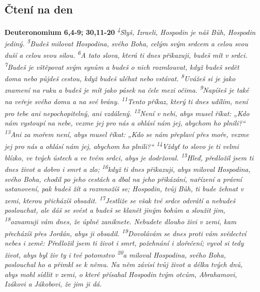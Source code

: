 \documentclass[11pt]{article}
\begin{document}
\subsection*{Čtení na den}
\textbf{Deuteronomium 6,4-9; 30,11-20}
\newline
\textit{
\textsuperscript{4}Slyš, Izraeli, Hospodin je náš Bůh, Hospodin jediný.
\textsuperscript{5}Budeš milovat Hospodina, svého Boha, celým svým srdcem a celou svou duší a celou svou silou.
\textsuperscript{6}A tato slova, která ti dnes přikazuji, budeš mít v srdci.
\textsuperscript{7}Budeš je vštěpovat svým synům a budeš o nich rozmlouvat, když budeš sedět doma nebo půjdeš cestou, když budeš uléhat nebo vstávat.
\textsuperscript{8}Uvážeš si je jako znamení na ruku a budeš je mít jako pásek na čele mezi očima.
\textsuperscript{9}Napíšeš je také na veřeje svého domu a na své brány.
\newline
\newline
\textsuperscript{11}Tento příkaz, který ti dnes udílím, není pro tebe ani nepochopitelný, ani vzdálený.
\textsuperscript{12}Není v nebi, abys musel říkat: „Kdo nám vystoupí na nebe, vezme jej pro nás a ohlásí nám jej, abychom ho plnili?“
\textsuperscript{13}Ani za mořem není, abys musel říkat: „Kdo se nám přeplaví přes moře, vezme jej pro nás a ohlásí nám jej, abychom ho plnili?“
\textsuperscript{14}Vždyť to slovo je ti velmi blízko, ve tvých ústech a ve tvém srdci, abys je dodržoval.
\textsuperscript{15}Hleď, předložil jsem ti dnes život a dobro i smrt a zlo;
\textsuperscript{16}když ti dnes přikazuji, abys miloval Hospodina, svého Boha, chodil po jeho cestách a dbal na jeho přikázání, nařízení a právní ustanovení, pak budeš žít a rozmnožíš se; Hospodin, tvůj Bůh, ti bude žehnat v zemi, kterou přicházíš obsadit.
\textsuperscript{17}Jestliže se však tvé srdce odvrátí a nebudeš poslouchat, ale dáš se svést a budeš se klanět jiným bohům a sloužit jim,
\textsuperscript{18}oznamuji vám dnes, že úplně zaniknete. Nebudete dlouho živi v zemi, kam přecházíš přes Jordán, abys ji obsadil.
\textsuperscript{19}Dovolávám se dnes proti vám svědectví nebes i země: Předložil jsem ti život i smrt, požehnání i zlořečení; vyvol si tedy život, abys byl živ ty i tvé potomstvo
\textsuperscript{20}a miloval Hospodina, svého Boha, poslouchal ho a přimkl se k němu. Na něm závisí tvůj život a délka tvých dnů, abys mohl sídlit v zemi, o které přísahal Hospodin tvým otcům, Abrahamovi, Izákovi a Jákobovi, že jim ji dá.
}
\end{document}
